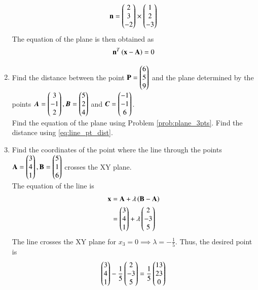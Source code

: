 \begin{enumerate}[label=\arabic*.,ref=\thesubsection.\theenumi]
%
\begin{align}
\mathbf{n} = \begin{pmatrix}2 \\ 3 \\ -2\end{pmatrix} \times \begin{pmatrix}1 \\ 2 \\ -3\end{pmatrix}
\end{align}
%
The equation of the plane is then obtained as
%
\begin{align}
\mathbf{n}^T\left(\mathbf{x}-\mathbf{A}\right) = 0
\end{align}
%
\item Find the distance between the point $\mathbf{P}=\begin{pmatrix}6\\5\\9\end{pmatrix}$ and the plane determined by the points $\bm{A}=\begin{pmatrix}3\\-1\\2\end{pmatrix}, \bm{B}=\begin{pmatrix}5\\2\\4\end{pmatrix}$ and $\bm{C}=\begin{pmatrix}-1\\-1\\6\end{pmatrix}$.
%
\\
\solution Find the equation of the plane using Problem \ref{prob:plane_3pts}.  Find the distance using \eqref{eq:line_pt_dist}.
%
\item Find the coordinates of the point where the line through the points
$
\mathbf{A}=\begin{pmatrix}3\\4\\1\end{pmatrix}, 
\mathbf{B}=\begin{pmatrix}5\\1\\6\end{pmatrix}
$
crosses the XY plane.
%
\\
\solution The equation of the line is 
%
\begin{align}
\mathbf{x} &= \mathbf{A}+\lambda\left(\mathbf{B}-\mathbf{A}\right)
\\
&= \begin{pmatrix}3\\4\\1\end{pmatrix} + \lambda \begin{pmatrix}2\\-3\\5\end{pmatrix}
\end{align}
%
The line  crosses the XY plane for $x_3 = 0 \implies \lambda = -\frac{1}{5}$. Thus, the desired point is
%
\begin{align}
 \begin{pmatrix}3\\4\\1\end{pmatrix} -\frac{1}{5}\begin{pmatrix}2\\-3\\5\end{pmatrix} = \frac{1}{5}\begin{pmatrix}13\\23\\0\end{pmatrix}
\end{align}
%
\end{enumerate}
%
